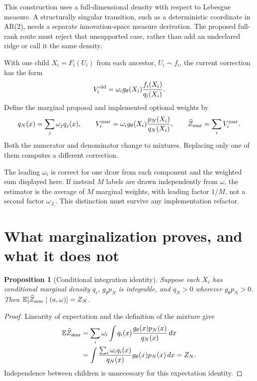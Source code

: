 \documentclass[11pt]{article}
\newtheorem{proposition}{Proposition}
\newcommand{\E}{\mathbb E}
\begin{document}
This construction uses a full-dimensional density with respect to Lebesgue
measure. A structurally singular transition, such as a deterministic
coordinate in AR(2), needs a separate innovation-space measure derivation.
The proposed full-rank route must reject that unsupported case, rather
than add an undeclared ridge or call it the same density.

With one child $X_i=F_i(U_i)$ from each ancestor, $U_i\sim f_i$, the current
correction has the form
\begin{equation}
 V_i^{\rm old}=\omega_i g_\theta(X_i)
                         \frac{f_i(X_i)}{q_i(X_i)} .
 \label{eq:old-weight}
\end{equation}
Define the marginal proposal and implemented optional weights by
\begin{equation}
 q_N(x)=\sum_j\omega_j q_j(x),\qquad
 V_i^{\rm mar}=\omega_i g_\theta(X_i)
                       \frac{p_N(X_i)}{q_N(X_i)},\qquad
 \widehat Z_{\rm mar}=\sum_i V_i^{\rm mar}.
 \label{eq:marginal-weight}
\end{equation}
Both the numerator and denominator change to mixtures. Replacing only one
of them computes a different correction.

The leading $\omega_i$ is correct for one draw from each component and the
weighted sum displayed here. If instead $M$ labels are drawn independently
from $\omega$, the estimator is the average of $M$ marginal weights, with
leading factor $1/M$, not a second factor $\omega_{J_i}$.
This distinction must survive any implementation refactor.

\section{What marginalization proves, and what it does not}

\begin{proposition}[Conditional integration identity]
\label{prop:integration}
Suppose each $X_i$ has conditional marginal density $q_i$, $g_\theta p_N$
is integrable, and $q_N>0$ wherever $g_\theta p_N>0$. Then
$\E[\widehat Z_{\rm mar}\mid (a,\omega)]=Z_N$.
\end{proposition}
\begin{proof}
Linearity of expectation and the definition of the mixture give
\begin{align}
 \E\widehat Z_{\rm mar}
 &=\sum_i\omega_i\int q_i(x)
                    \frac{g_\theta(x)p_N(x)}{q_N(x)}\,dx \notag\\
 &=\int\frac{\sum_i\omega_i q_i(x)}{q_N(x)}
                        g_\theta(x)p_N(x)\,dx
 =Z_N .
 \label{eq:integration-proof}
\end{align}
Independence between children is unnecessary for this expectation identity.
\end{proof}
\end{document}
